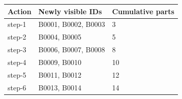 \begin{tabular}{@{}lll@{}}
\toprule
Action & Newly visible IDs & Cumulative parts\\
\midrule
step-1 & B0001, B0002, B0003 & 3\\
step-2 & B0004, B0005 & 5\\
step-3 & B0006, B0007, B0008 & 8\\
step-4 & B0009, B0010 & 10\\
step-5 & B0011, B0012 & 12\\
step-6 & B0013, B0014 & 14\\
\bottomrule
\end{tabular}

